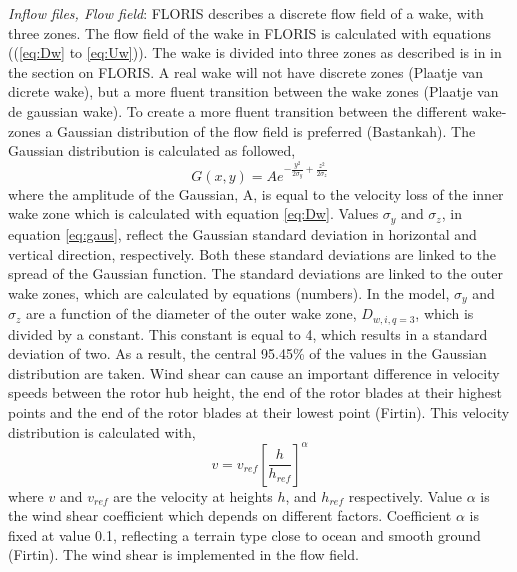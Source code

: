 \textit{Inflow files, Flow field}: FLORIS describes a discrete flow field of a wake, with three zones. The flow field of the wake in FLORIS is calculated with equations ((\ref{eq:Dw} to \ref{eq:Uw})). The wake is divided into three zones as described is in in the section on FLORIS. A real wake will not have discrete zones (Plaatje van dicrete wake), but a more fluent transition between the wake zones (Plaatje van de gaussian wake). To create a more fluent transition between the different wake-zones a Gaussian distribution of the flow field is preferred (Bastankah). The Gaussian distribution is calculated as followed, 
\begin{equation}
\label{eq:gaus}
G(x, y) = A e^{-\frac{y^2}{2\sigma_y} + \frac{z^2}{2\sigma_z}}
\end{equation}
where the amplitude of the Gaussian, A, is equal to the velocity loss of the inner wake zone which is calculated with equation \ref{eq:Dw}. Values $\sigma_y$ and $\sigma_z$, in equation \ref{eq:gaus}, reflect the Gaussian standard deviation in horizontal and vertical direction, respectively. Both these standard deviations are linked to the spread of the Gaussian function. The standard deviations are linked to the outer wake zones, which are calculated by equations (numbers). In the model, $\sigma_y$ and $\sigma_z$ are a function of the diameter of the outer wake zone,  $D_{w,i,q=3}$, which is divided by a constant. This constant is equal to 4, which results in a standard deviation of two. As a result, the central 95.45\% of the values in the Gaussian distribution are taken. 
Wind shear can cause an important difference in velocity speeds between the rotor hub height, the end of the rotor blades at their highest points and the end of the rotor blades at their lowest point (Firtin). This velocity distribution is calculated with, 
\begin{equation}
\label{eq:shear}
v = v_{ref} \left[\frac{h}{h_{ref}}\right]^\alpha
\end{equation}
where $v$ and $v_{ref}$ are the velocity at heights $h$, and $h_{ref}$  respectively. Value $\alpha$ is the wind shear coefficient which depends on different factors. Coefficient $\alpha$ is fixed at value 0.1, reflecting a terrain type close to ocean and smooth ground (Firtin). The wind shear is implemented in the flow field.

